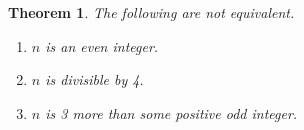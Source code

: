 \documentclass{article}
\theoremstyle{plain}
\newtheorem{theorem}{Theorem}
\begin{document}
\begin{theorem}
	The following are not equivalent.

	\begin{enumerate}
		\item $n$ is an even integer.
		\item $n$ is divisible by 4.
		\item $n$ is 3 more than some positive odd integer.  
	\end{enumerate}
\end{theorem}
\end{document}
